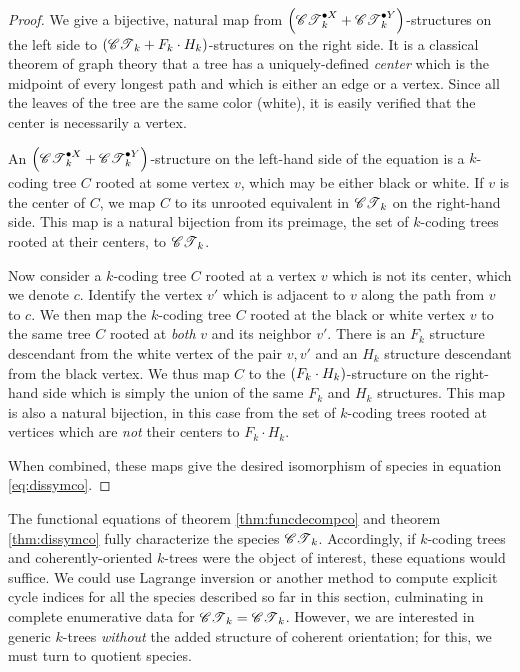 \documentclass[sectionflow,singlespace,twoside,boldmathhdr]{brandiss} %
\numberwithin{section}{chapter}
\numberwithin{figure}{chapter}
\begin{document}
\begin{proof}
  We give a bijective, natural map from $\pbrac{\pointed[X]{\specname{CT}}_{k} + \pointed[Y]{\specname{CT}}_{k}}$-structures on the left side to $\pbrac{\specname{CT}_{k} + F_{k} \cdot H_{k}}$-structures on the right side.
  It is a classical theorem of graph theory that a tree has a uniquely-defined \emph{center} which is the midpoint of every longest path and which is either an edge or a vertex.
  Since all the leaves of the tree are the same color (white), it is easily verified that the center is necessarily a vertex.
  
  An $\pbrac{\pointed[X]{\specname{CT}}_{k} + \pointed[Y]{\specname{CT}}_{k}}$-structure on the left-hand side of the equation is a $k$-coding tree $C$ rooted at some vertex $v$, which may be either black or white.
  If $v$ is the center of $C$, we map $C$ to its unrooted equivalent in $\specname{CT}_{k}$ on the right-hand side.
  This map is a natural bijection from its preimage, the set of $k$-coding trees rooted at their centers, to $\specname{CT}_{k}$.

  Now consider a $k$-coding tree $C$ rooted at a vertex $v$ which is not its center, which we denote $c$.
  Identify the vertex $v'$ which is adjacent to $v$ along the path from $v$ to $c$.
  We then map the $k$-coding tree $C$ rooted at the black or white vertex $v$ to the same tree $C$ rooted at \emph{both} $v$ and its neighbor $v'$.
  There is an $F_{k}$ structure descendant from the white vertex of the pair $v, v'$ and an $H_{k}$ structure descendant from the black vertex.
  We thus map $C$ to the $\pbrac{F_{k} \cdot H_{k}}$-structure on the right-hand side which is simply the union of the same $F_{k}$ and $H_{k}$ structures.
  This map is also a natural bijection, in this case from the set of $k$-coding trees rooted at vertices which are \emph{not} their centers to $F_{k} \cdot H_{k}$.

  When combined, these maps give the desired isomorphism of species in equation \eqref{eq:dissymco}.
\end{proof}

The functional equations of theorem \ref{thm:funcdecompco} and theorem \ref{thm:dissymco} fully characterize the species $\specname{CT}_{k}$.
Accordingly, if $k$-coding trees and coherently-oriented $k$-trees were the object of interest, these equations would suffice.
We could use Lagrange inversion or another method to compute explicit cycle indices for all the species described so far in this section, culminating in complete enumerative data for $\specname{CT}_{k} = \specname{CT}_{k}$.
However, we are interested in generic $k$-trees \emph{without} the added structure of coherent orientation; for this, we must turn to quotient species.
\end{document}
